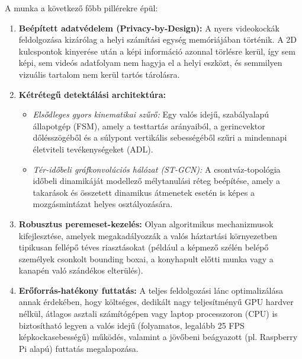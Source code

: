 \documentclass[12pt,a4paper,oneside]{report}
\begin{document}
A munka a következő főbb pillérekre épül:
\begin{enumerate}
    \item \textbf{Beépített adatvédelem (Privacy-by-Design):} A nyers videokockák feldolgozása kizárólag a helyi számítási egység memóriájában történik. A 2D kulcspontok kinyerése után a képi információ azonnal törlésre kerül, így sem képi, sem videós adatfolyam nem hagyja el a helyi eszközt, és semmilyen vizuális tartalom nem kerül tartós tárolásra.
    \item \textbf{Kétrétegű detektálási architektúra:}
    \begin{itemize}
        \item \textit{Elsődleges gyors kinematikai szűrő:} Egy valós idejű, szabályalapú állapotgép (FSM), amely a testtartás arányaiból, a gerincvektor dőlésszögéből és a súlypont vertikális sebességéből szűri a mindennapi életviteli tevékenységeket (ADL).
        \item \textit{Tér-időbeli gráfkonvolúciós hálózat (ST-GCN):} A csontváz-topológia időbeli dinamikáját modellező mélytanulási réteg beépítése, amely a takarások és összetett dinamikus átmenetek esetén is képes a mozgásmintázat helyes osztályozására.
    \end{itemize}
    \item \textbf{Robusztus peremeset-kezelés:} Olyan algoritmikus mechanizmusok kifejlesztése, amelyek megakadályozzák a valós háztartási környezetben tipikusan fellépő téves riasztásokat (például a képmező szélén belépő személyek csonkolt bounding boxai, a konyhapult előtti munka vagy a kanapén való szándékos elterülés).
    \item \textbf{Erőforrás-hatékony futtatás:} A teljes feldolgozási lánc optimalizálása annak érdekében, hogy költséges, dedikált nagy teljesítményű GPU hardver nélkül, átlagos asztali számítógépen vagy laptop processzoron (CPU) is biztosítható legyen a valós idejű (folyamatos, legalább 25 FPS képkockasebességű) működés, valamint a jövőbeni beágyazott (pl. Raspberry Pi alapú) futtatás megalapozása.
\end{enumerate}
\end{document}
